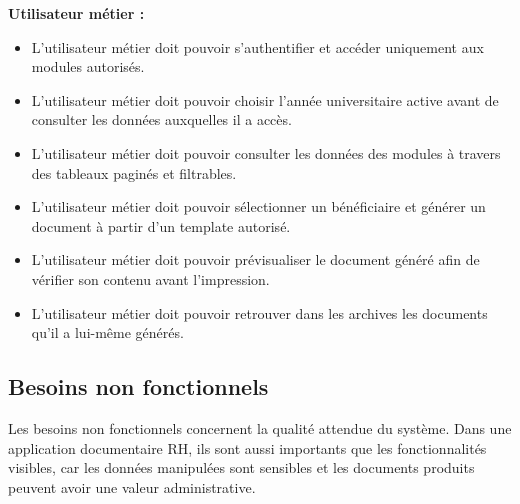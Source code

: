 \textbf{Utilisateur métier :}
\begin{itemize}
    \item L'utilisateur métier doit pouvoir s'authentifier et accéder uniquement aux modules autorisés.
 \item L'utilisateur métier doit pouvoir choisir l'année universitaire active avant de consulter les données auxquelles il a accès.
    \item L'utilisateur métier doit pouvoir consulter les données des modules à travers des tableaux paginés et filtrables.
    \item L'utilisateur métier doit pouvoir sélectionner un bénéficiaire et générer un document à partir d'un template autorisé.
    \item L'utilisateur métier doit pouvoir prévisualiser le document généré afin de vérifier son contenu avant l'impression.
    \item L'utilisateur métier doit pouvoir retrouver dans les archives les documents qu'il a lui-même générés.
\end{itemize}

\subsection{Besoins non fonctionnels}

Les besoins non fonctionnels concernent la qualité attendue du système. Dans une application documentaire RH, ils sont aussi importants que les fonctionnalités visibles, car les données manipulées sont sensibles et les documents produits peuvent avoir une valeur administrative.


